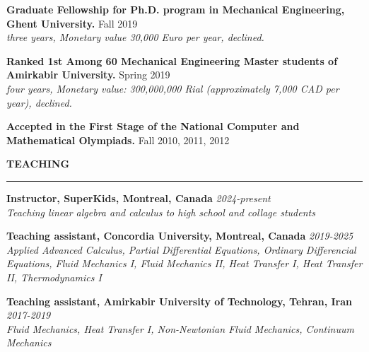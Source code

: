 \documentclass[10pt]{article}
\begin{document}
		
	\noindent \textbf {\small  Graduate Fellowship for Ph.D. program in Mechanical Engineering, Ghent University.} \hfill {Fall 2019} 
		\\ \textit{three years, Monetary value 30,000 Euro per year, declined.}
		
			
	\noindent \textbf {\small Ranked 1st Among 60 Mechanical Engineering Master students of Amirkabir University.} \hfill {Spring 2019} 
		\\ \textit{four years, Monetary value: 300,000,000 Rial (approximately 7,000 CAD per year), declined.}
		
		
	\noindent \textbf {\small Accepted in the First Stage of the National Computer and Mathematical Olympiads.} \hfill {Fall 2010, 2011, 2012} 
		\vspace{1.5mm}
		
		
		
		\noindent \textbf{\color{violet}TEACHING}
		
		\vspace{-2mm}
		
		\noindent\rule[0.5ex]{\linewidth}{1pt}
		
		{\noindent  \bf Instructor, SuperKids, Montreal, Canada} \hfill {\em 2024-present} 
		\\ \textit{Teaching linear algebra and calculus to high school and collage students}
		
		\vspace{1.5mm}
		
		{\noindent  \bf Teaching assistant, Concordia University, Montreal, Canada} \hfill {\em 2019-2025} 
		\\ \textit{Applied Advanced Calculus, Partial Differential Equations, Ordinary Differencial Equations, Fluid Mechanics I, Fluid Mechanics II, Heat Transfer I, Heat Transfer II, Thermodynamics I}
		
		\vspace{1.5mm}
		
		{\noindent  \bf Teaching assistant, Amirkabir University of Technology, Tehran, Iran} \hfill {\em 2017-2019} 
		\\ \textit{Fluid Mechanics, Heat Transfer I, Non-Newtonian Fluid Mechanics, Continuum Mechanics}
		
		
		
\end{document}
